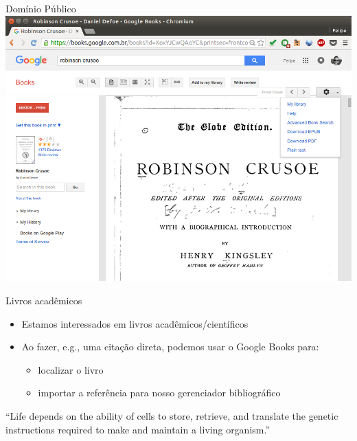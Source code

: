 \documentclass{beamer}
\begin{document}
\begin{frame}{Domínio Público}
  \includegraphics[height=.85\textheight]{Busca/gbooks-publicdomain}
\end{frame}

\begin{frame}{Livros acadêmicos}
  \begin{itemize}
  \item Estamos interessados em livros acadêmicos/científicos
  \item Ao fazer, e.g., uma citação direta, podemos usar o Google
    Books para:
    \begin{itemize}
    \item localizar o livro
    \item importar a referência para nosso gerenciador bibliográfico
    \end{itemize}
  \end{itemize}
  \begin{example}
    ``Life depends on the ability of cells to store, retrieve, and
    translate the genetic instructions required to make and maintain a
    living organism.''
  \end{example}
\end{frame}
\end{document}
